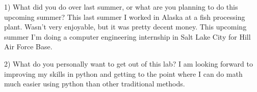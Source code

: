 % 
% 


1) What did you do over last summer, or what are you planning to do this upcoming summer?
	This last summer I worked in Alaska at a fish processing plant. Wasn't very enjoyable, but it was pretty decent money. This upcoming summer I'm doing a computer engineering internship in Salt Lake City for Hill Air Force Base.

2) What do you personally want to get out of this lab?
	I am looking forward to improving my skills in python and getting to the point where I can do math much easier using python than other traditional methods.

